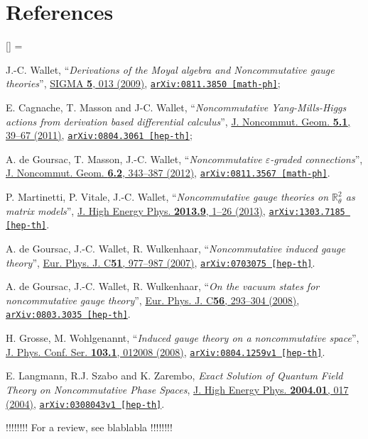 \documentclass[a4paper,11pt,twoside]{article}
\numberwithin{equation}{section}
\newcommand{\doi}[2]{\href{http://dx.doi.org/#1}{#2}}
\newcommand{\arxiv}[3]{\href{#3}{\texttt{arXiv:#1 [#2]}}}
\theoremstyle{nonumberplain}
\newcounter{and}
\renewenvironment{thebibliography}[1]{%
\section*{References}%
\frenchspacing\small%
\begin{list}{[\arabic{enumi}]}%
{%
\usecounter{enumi}\parsep=2pt\topsep 0pt%
\settowidth{\labelwidth}{[#1]}%
\leftmargin=\labelwidth\advance\leftmargin\labelsep%
\rightmargin=0pt\itemsep=1pt\sloppy%
}%
}{\end{list}}
\begin{document}
\begin{thebibliography}{88}
%
J.-C. Wallet, %
``\emph{Derivations of the Moyal algebra and Noncommutative gauge theories}'', %
\doi{10.3842/SIGMA.2009.013}{SIGMA \textbf{5}, 013 (2009)}, %
\arxiv{0811.3850}{math-ph}{http://arxiv.org/abs/arXiv:0811.3850};\par%
E. Cagnache, T. Masson and J-C. Wallet, %
``\emph{Noncommutative Yang-Mills-Higgs actions from derivation based differential calculus}'', %
\doi{10.4171/JNCG/69}{J. Noncommut. Geom. \textbf{5.1}, 39--67 (2011)}, %
\arxiv{0804.3061}{hep-th}{http://arxiv.org/abs/arXiv:0804.3061};\par%
A. de Goursac, T. Masson, J.-C. Wallet, %
``\emph{Noncommutative $\varepsilon$-graded connections}'', %
\doi{10.4171/JNCG/94}{J. Noncommut. Geom. \textbf{6.2}, 343--387 (2012)}, %
\arxiv{0811.3567}{math-ph}{http://arxiv.org/abs/arXiv:0811.3567}.%

%
P. Martinetti, P. Vitale, J.-C. Wallet, %
``\emph{Noncommutative gauge theories on $\mathbb{R}^2_\theta$ as matrix models}'', %
\doi{10.1007/JHEP09(2013)051}{J. High Energy Phys. \textbf{2013.9}, 1--26 (2013)}, %
\arxiv{1303.7185}{hep-th}{http://arxiv.org/abs/1303.7185}.%

%
A. de Goursac, J.-C. Wallet, R. Wulkenhaar, %
``\emph{Noncommutative induced gauge theory}'', %
\doi{10.1140/epjc/s10052-007-0335-2}{Eur. Phys. J. C\textbf{51}, 977--987 (2007)}, %
\arxiv{0703075}{hep-th}{http://arxiv.org/abs/hep-th/0703075}.%

%
A. de Goursac, J.-C. Wallet, R. Wulkenhaar, %
``\emph{On the vacuum states for noncommutative gauge theory}'', %
\doi{10.1140/epjc/s10052-008-0652-0}{Eur. Phys. J. C\textbf{56}, 293--304 (2008)}, %
\arxiv{0803.3035}{hep-th}{http://arxiv.org/abs/arXiv:0803.3035}.%

%
H. Grosse, M. Wohlgenannt, %
``\emph{Induced gauge theory on a noncommutative space}'', %
\doi{10.1088/1742-6596/103/1/012008}{J. Phys. Conf. Ser. \textbf{103.1}, 012008 (2008)}, %
\arxiv{0804.1259v1}{hep-th}{http://arxiv.org/abs/0804.1259v1}.%

%
E. Langmann, R.J. Szabo and K. Zarembo, %
\emph{Exact Solution of Quantum Field Theory on Noncommutative Phase Spaces}, %
\doi{10.1088/1126-6708/2004/01/017}{J. High Energy Phys. \textbf{2004.01}, 017 (2004)}, %
\arxiv{0308043v1}{hep-th}{http://arxiv.org/abs/hep-th/0308043v1}.%

%
!!!!!!!! For a review, see blablabla !!!!!!!!%

\end{thebibliography}

\end{document}
